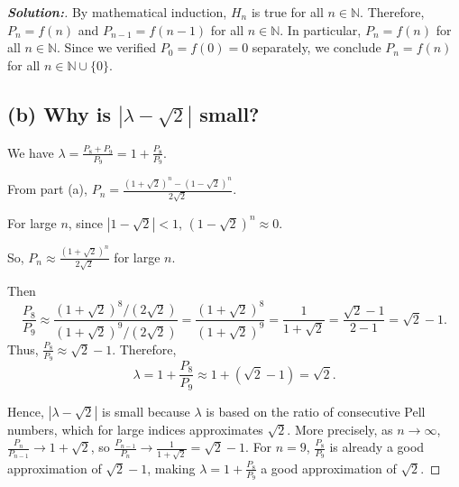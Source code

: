 \documentclass[12pt]{article}
\theoremstyle{definition}\newtheorem{problem}{Problem}
\newenvironment{solution}{\begin{proof}[\bfseries\textup{Solution:}]}{\end{proof}}
\newcommand{\N}{\mathbb{N}}
\begin{document}
\begin{solution}
    By mathematical induction, $H_n$ is true for all $n \in \N$. Therefore, $P_n = f(n)$ and $P_{n-1} = f(n-1)$ for all $n \in \N$. In particular, $P_n = f(n)$ for all $n \in \N$. Since we verified $P_0 = f(0) = 0$ separately, we conclude $P_n = f(n)$ for all $n \in \N \cup \{0\}$.

\subsection*{(b) Why is $|\lambda - \sqrt{2}|$ small?}

We have $\lambda = \frac{P_8+P_9}{P_9} = 1 + \frac{P_8}{P_9}$.

From part (a), $P_n = \frac{(1+\sqrt2)^n - (1-\sqrt2)^n}{2\sqrt2}$. 

For large $n$, since $|1-\sqrt2| < 1$, $(1-\sqrt2)^n \approx 0$.

So, $P_n \approx \frac{(1+\sqrt2)^n}{2\sqrt2}$ for large $n$.

Then $$\frac{P_8}{P_9} \approx \frac{(1+\sqrt2)^8 / (2\sqrt2)}{(1+\sqrt2)^9 / (2\sqrt2)} = \frac{(1+\sqrt2)^8}{(1+\sqrt2)^9} = \frac{1}{1+\sqrt2}= \frac{\sqrt2-1}{2-1} = \sqrt2-1.$$
Thus, $\frac{P_8}{P_9} \approx \sqrt{2}-1$.
Therefore, $$\lambda = 1 + \frac{P_8}{P_9} \approx 1 + (\sqrt{2}-1) = \sqrt{2}.$$

Hence, $|\lambda - \sqrt{2}|$ is small because $\lambda$ is based on the ratio of consecutive Pell numbers, which for large indices approximates $\sqrt{2}$.  More precisely, as $n \to \infty$, $\frac{P_{n}}{P_{n-1}} \to 1+\sqrt{2}$, so $\frac{P_{n-1}}{P_{n}} \to \frac{1}{1+\sqrt{2}} = \sqrt{2}-1$. For $n=9$, $\frac{P_8}{P_9}$ is already a good approximation of $\sqrt{2}-1$, making $\lambda = 1 + \frac{P_8}{P_9}$ a good approximation of $\sqrt{2}$.
\end{solution}
\end{document}
